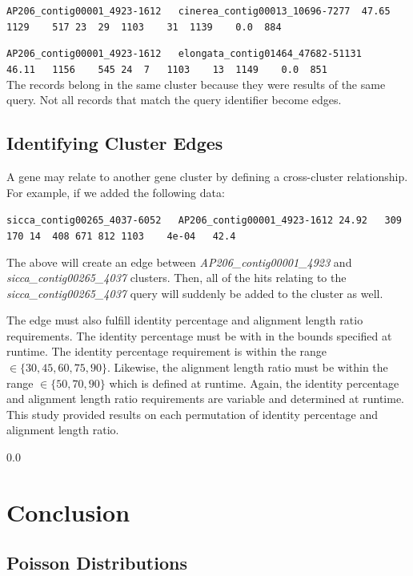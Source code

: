\documentclass[11pt,notitlepage]{article}
\begin{document}
  \noindent \verb|AP206_contig00001_4923-1612	cinerea_contig00013_10696-7277	47.65	1129	517	23	29	1103	31	1139	0.0	 884|

  \noindent \verb|AP206_contig00001_4923-1612	elongata_contig01464_47682-51131	46.11	1156	545	24	7	1103	13	1149	0.0	 851|
  \\

  The records belong in the same cluster because they were results of the same query. Not
  all records that match the query identifier become edges. 

  \subsection{Identifying Cluster Edges} 
  
  A gene may relate to another gene cluster by defining a cross-cluster relationship. For example, if we added the 
  following data:

  \noindent \verb|sicca_contig00265_4037-6052	AP206_contig00001_4923-1612	24.92	309	170	14	408	671	812	1103	4e-04	42.4|

  The above will create an edge between \emph{AP206\_contig00001\_4923} and \emph{sicca\_contig00265\_4037}
  clusters. Then, all of the hits relating to the \emph{sicca\_contig00265\_4037} query will
  suddenly be added to the cluster as well.

  The edge must also fulfill 
  identity percentage and alignment length ratio requirements. The identity percentage must
  be with in the bounds specified at runtime. The identity percentage requirement is within the range 
  $\in \{30, 45, 60, 75, 90\}$. Likewise, the alignment length ratio must be within the range
  $\in \{50, 70, 90\}$ which is defined at runtime. Again, the identity percentage and
  alignment length ratio requirements are variable and determined at runtime. This study
  provided results on each permutation of identity percentage and alignment length ratio.



  {\setlength{\baselineskip}%
           {0.0\baselineskip}
  \section*{\hfill Conclusion}
  \hrulefill \par}
  
  \subsection{Poisson Distributions}
\end{document}
